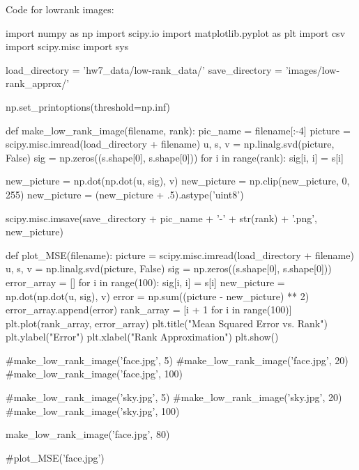\documentclass{article}
\begin{document}
Code for lowrank images:
\begin{python}
import numpy as np
import scipy.io
import matplotlib.pyplot as plt
import csv
import scipy.misc
import sys

load_directory = 'hw7_data/low-rank_data/'
save_directory = 'images/low-rank_approx/'

np.set_printoptions(threshold=np.inf)

def make_low_rank_image(filename, rank):
    pic_name = filename[:-4]
    picture = scipy.misc.imread(load_directory + filename)
    u, s, v = np.linalg.svd(picture, False)
    sig = np.zeros((s.shape[0], s.shape[0]))
    for i in range(rank):
        sig[i, i] = s[i]

    new_picture = np.dot(np.dot(u, sig), v)
    new_picture = np.clip(new_picture, 0, 255)
    new_picture = (new_picture + .5).astype('uint8')

    scipy.misc.imsave(save_directory + pic_name + '-' +
        str(rank) + '.png', new_picture)

def plot_MSE(filename):
    picture = scipy.misc.imread(load_directory + filename)
    u, s, v = np.linalg.svd(picture, False)
    sig = np.zeros((s.shape[0], s.shape[0]))
    error_array = []
    for i in range(100):
        sig[i, i] = s[i]
        new_picture = np.dot(np.dot(u, sig), v)
        error = np.sum((picture - new_picture) ** 2)
        error_array.append(error)
    rank_array = [i + 1 for i in range(100)]
    plt.plot(rank_array, error_array)
    plt.title("Mean Squared Error vs. Rank")
    plt.ylabel("Error")
    plt.xlabel("Rank Approximation")
    plt.show()

#make_low_rank_image('face.jpg', 5)
#make_low_rank_image('face.jpg', 20)
#make_low_rank_image('face.jpg', 100)

#make_low_rank_image('sky.jpg', 5)
#make_low_rank_image('sky.jpg', 20)
#make_low_rank_image('sky.jpg', 100)

make_low_rank_image('face.jpg', 80)

#plot_MSE('face.jpg')
\end{python}
\end{document}
